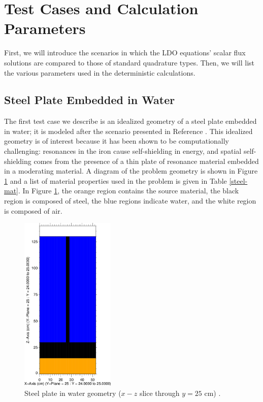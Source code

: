 \documentclass{article} %
\begin{document}
\section{Test Cases and Calculation Parameters}

First, we will introduce the scenarios in which the LDO equations' scalar flux
solutions are compared to those of standard quadrature types. Then, we will list
the various parameters used in the deterministic calculations.

\subsection{Steel Plate Embedded in Water}

The first test case we describe is an idealized geometry of a steel plate 
embedded in water; it is modeled after the scenario presented in Reference 
\cite{wilsonslaybaugh}. This idealized geometry is of interest because it has
been shown to be computationally challenging: resonances in the iron cause
self-shielding in energy, and spatial self-shielding comes from the presence
of a thin plate of resonance material embedded in a moderating material.
A diagram of the problem geometry is shown in Figure \ref{steelxz} and a list
of material properties used in the problem is given in Table \ref{steel-mat}.
In Figure \ref{steelxz}, the orange region contains the source material, the 
black region is composed of steel, the blue regions indicate water, and the 
white region is composed of air.

\begin{figure}[!htb]
\centering
\includegraphics[width=0.4\textwidth]{steel-xz.png}
\caption{Steel plate in water geometry ($x-z$ slice through $y = 25$ cm) 
         \cite{wilsonslaybaugh}.}
\label{steelxz}
\end{figure}
\end{document}
